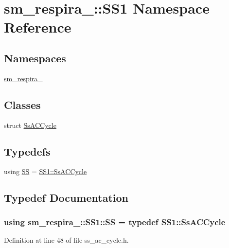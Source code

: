 \hypertarget{namespacesm__respira__1_1_1SS1}{}\section{sm\+\_\+respira\+\_\+:\+:S\+S1 Namespace Reference}
\label{namespacesm__respira__1_1_1SS1}
\subsection*{Namespaces}
\begin{DoxyCompactItemize}
\item 
 \hyperlink{namespacesm__respira__1_1_1SS1_1_1sm__respira__1}{sm\+\_\+respira\+\_}
\end{DoxyCompactItemize}
\subsection*{Classes}
\begin{DoxyCompactItemize}
\item 
struct \hyperlink{structsm__respira__1_1_1SS1_1_1SsACCycle}{Ss\+A\+C\+Cycle}
\end{DoxyCompactItemize}
\subsection*{Typedefs}
\begin{DoxyCompactItemize}
\item 
using \hyperlink{namespacesm__respira__1_1_1SS1_a0e01350d6b2d86177855e50b8a5731a4}{SS} = \hyperlink{structsm__respira__1_1_1SS1_1_1SsACCycle}{S\+S1\+::\+Ss\+A\+C\+Cycle}
\end{DoxyCompactItemize}


\subsection{Typedef Documentation}
\subsubsection[{\texorpdfstring{SS}{SS}}]{\setlength{\rightskip}{0pt plus 5cm}using {\bf sm\+\_\+respira\+\_\+::\+S\+S1\+::\+SS} = typedef {\bf S\+S1\+::\+Ss\+A\+C\+Cycle}}\hypertarget{namespacesm__respira__1_1_1SS1_a0e01350d6b2d86177855e50b8a5731a4}{}\label{namespacesm__respira__1_1_1SS1_a0e01350d6b2d86177855e50b8a5731a4}


Definition at line 48 of file ss\+\_\+ac\+\_\+cycle.\+h.

